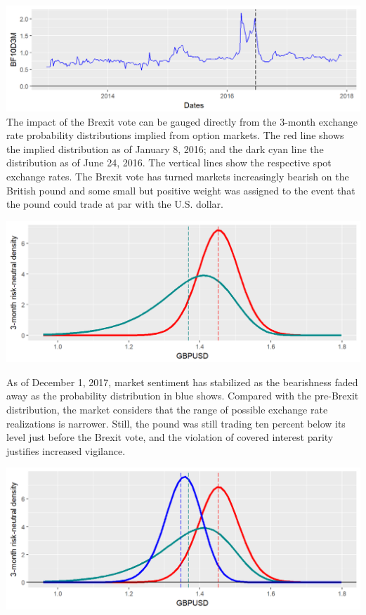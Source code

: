 \documentclass[]{book}
\theoremstyle{definition}
\theoremstyle{definition}
\theoremstyle{definition}
\theoremstyle{remark}
\begin{document}
\includegraphics[width=1\linewidth]{images/unnamed-chunk-72-1} The
impact of the Brexit vote can be gauged directly from the 3-month
exchange rate probability distributions implied from option markets. The
red line shows the implied distribution as of January 8, 2016; and the
dark cyan line the distribution as of June 24, 2016. The vertical lines
show the respective spot exchange rates. The Brexit vote has turned
markets increasingly bearish on the British pound and some small but
positive weight was assigned to the event that the pound could trade at
par with the U.S. dollar.

\includegraphics[width=1\linewidth]{images/unnamed-chunk-73-1}

As of December 1, 2017, market sentiment has stabilized as the
bearishness faded away as the probability distribution in blue shows.
Compared with the pre-Brexit distribution, the market considers that the
range of possible exchange rate realizations is narrower. Still, the
pound was still trading ten percent below its level just before the
Brexit vote, and the violation of covered interest parity justifies
increased vigilance.

\includegraphics[width=1\linewidth]{images/unnamed-chunk-74-1}


\end{document}
